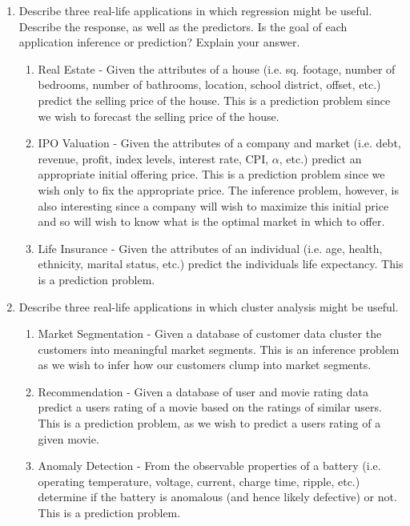 \documentclass[11pt]{article}
\begin{document}
\begin{enumerate}
\begin{enumerate}
\item Describe three real-life applications in which regression might be useful.  Describe the response, as well as the predictors.  Is the goal of each application inference or prediction? Explain your answer.
\begin{enumerate}
\item Real Estate - Given the attributes of a house (i.e. sq. footage, number of bedrooms, number of bathrooms, location, school district, offset, etc.) predict the selling price of the house.  This is a prediction problem since we wish to forecast the selling price of the house.
\item IPO Valuation - Given the attributes of a company and market (i.e. debt, revenue, profit, index levels, interest rate, CPI, $\alpha$, etc.) predict an appropriate initial offering price.  This is a prediction problem since we wish only to fix the appropriate price.  The inference problem, however,  is also interesting since a company will wish to maximize this initial price and so will wish to know what is the optimal market in which to offer.
\item  Life Insurance - Given the attributes of an individual (i.e. age, health, ethnicity, marital status, etc.) predict the individuals life expectancy.  This is a prediction problem. 
\end{enumerate}

\item  Describe three real-life applications in which cluster analysis might be useful.
\begin{enumerate}
\item Market Segmentation - Given a database of customer data cluster the customers into meaningful market segments.  This is an inference problem as we wish to infer how our customers clump into market segments.
\item Recommendation - Given a database of user and movie rating data predict a users rating of a movie based on the ratings of similar users.  This is a prediction problem, as we wish to predict a users rating of a given movie.
\item Anomaly Detection - From the observable properties of a battery (i.e. operating temperature,  voltage, current, charge time, ripple, etc.) determine if the battery is anomalous (and hence likely defective) or not.  This is a prediction problem. 
\end{enumerate}
\end{enumerate}


\end{enumerate}
\end{document}
